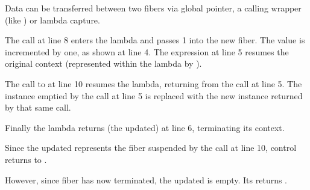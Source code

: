 
Data can be transferred between two fibers via global pointer, a calling
wrapper (like ) or lambda capture.

The \resume call at line 8 enters the lambda and passes 1 into the
new fiber. The value is incremented by one, as shown at line 4. The expression
 at line 5 resumes the original context (represented
within the lambda by ).

The call to  at line 10 resumes the lambda, returning from
the  call at line 5. The \fiber instance 
emptied by the \resume call at line 5 is replaced with the new instance
returned by that same \resume call.

Finally the lambda returns (the updated)  at line 6, terminating its
context.

Since the updated  represents the fiber suspended by the call at
line 10, control returns to \main.

However, since fiber  has now terminated, the updated 
is empty. Its \opbool returns \false.

